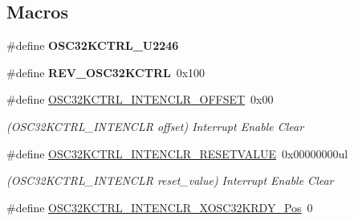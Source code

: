 \subsection*{Macros}
\begin{DoxyCompactItemize}
\item 
\hypertarget{group___s_a_m_l21___o_s_c32_k_c_t_r_l_ga8bfa1e5c3671441ada647ab3b829a087}{}\#define {\bfseries O\+S\+C32\+K\+C\+T\+R\+L\+\_\+\+U2246}\label{group___s_a_m_l21___o_s_c32_k_c_t_r_l_ga8bfa1e5c3671441ada647ab3b829a087}

\item 
\hypertarget{group___s_a_m_l21___o_s_c32_k_c_t_r_l_ga4f74f492a5ffcfdf0f22aca1812e134c}{}\#define {\bfseries R\+E\+V\+\_\+\+O\+S\+C32\+K\+C\+T\+R\+L}~0x100\label{group___s_a_m_l21___o_s_c32_k_c_t_r_l_ga4f74f492a5ffcfdf0f22aca1812e134c}

\item 
\hypertarget{group___s_a_m_l21___o_s_c32_k_c_t_r_l_ga22544563390854dfa7f044a4b83abb54}{}\#define \hyperlink{group___s_a_m_l21___o_s_c32_k_c_t_r_l_ga22544563390854dfa7f044a4b83abb54}{O\+S\+C32\+K\+C\+T\+R\+L\+\_\+\+I\+N\+T\+E\+N\+C\+L\+R\+\_\+\+O\+F\+F\+S\+E\+T}~0x00\label{group___s_a_m_l21___o_s_c32_k_c_t_r_l_ga22544563390854dfa7f044a4b83abb54}

\begin{DoxyCompactList}\small\item\em (O\+S\+C32\+K\+C\+T\+R\+L\+\_\+\+I\+N\+T\+E\+N\+C\+L\+R offset) Interrupt Enable Clear \end{DoxyCompactList}\item 
\hypertarget{group___s_a_m_l21___o_s_c32_k_c_t_r_l_gad3aafd31e91ecf11f10d847aca17c178}{}\#define \hyperlink{group___s_a_m_l21___o_s_c32_k_c_t_r_l_gad3aafd31e91ecf11f10d847aca17c178}{O\+S\+C32\+K\+C\+T\+R\+L\+\_\+\+I\+N\+T\+E\+N\+C\+L\+R\+\_\+\+R\+E\+S\+E\+T\+V\+A\+L\+U\+E}~0x00000000ul\label{group___s_a_m_l21___o_s_c32_k_c_t_r_l_gad3aafd31e91ecf11f10d847aca17c178}

\begin{DoxyCompactList}\small\item\em (O\+S\+C32\+K\+C\+T\+R\+L\+\_\+\+I\+N\+T\+E\+N\+C\+L\+R reset\+\_\+value) Interrupt Enable Clear \end{DoxyCompactList}\item 
\hypertarget{group___s_a_m_l21___o_s_c32_k_c_t_r_l_gac526cada7174d6b98a29d5f0cf44ae97}{}\#define \hyperlink{group___s_a_m_l21___o_s_c32_k_c_t_r_l_gac526cada7174d6b98a29d5f0cf44ae97}{O\+S\+C32\+K\+C\+T\+R\+L\+\_\+\+I\+N\+T\+E\+N\+C\+L\+R\+\_\+\+X\+O\+S\+C32\+K\+R\+D\+Y\+\_\+\+Pos}~0\label{group___s_a_m_l21___o_s_c32_k_c_t_r_l_gac526cada7174d6b98a29d5f0cf44ae97}


\end{DoxyCompactItemize}
